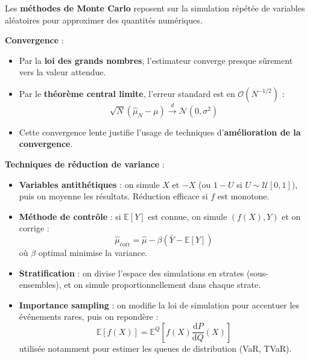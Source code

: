 \begin{f}

Les \textbf{méthodes de Monte Carlo} reposent sur la simulation répétée de variables aléatoires pour approximer des quantités numériques.

\textbf{Convergence} :
\begin{itemize}[nosep]
	\item Par la \textbf{loi des grands nombres}, l’estimateur converge presque sûrement vers la valeur attendue.
	\item Par le \textbf{théorème central limite}, l’erreur standard est en $\mathcal{O}(N^{-1/2})$ :
	\[
	\sqrt{N}(\hat{\mu}_N - \mu) \xrightarrow{d} \mathcal{N}(0, \sigma^2)
	\]
	\item Cette convergence lente justifie l’usage de techniques d’\textbf{amélioration de la convergence}.
\end{itemize}

\textbf{Techniques de réduction de variance} :
\begin{itemize}
	\item \textbf{Variables antithétiques} : on simule $X$ et $-X$ (ou $1-U$ si $U \sim \mathcal{U}[0,1]$), puis on moyenne les résultats. Réduction efficace si $f$ est monotone.
	\item \textbf{Méthode de contrôle} : si $\mathbb{E}[Y]$ est connue, on simule $(f(X), Y)$ et on corrige :
	\[
	\hat{\mu}_\text{corr} = \hat{\mu} - \beta(\bar{Y} - \mathbb{E}[Y])
	\]
	où $\beta$ optimal minimise la variance.
	\item \textbf{Stratification} : on divise l’espace des simulations en strates (sous-ensembles), et on simule proportionnellement dans chaque strate.
	\item \textbf{Importance sampling} : on modifie la loi de simulation pour accentuer les événements rares, puis on repondère :
	\[
	\mathbb{E}[f(X)] = \mathbb{E}^{Q}\left[f(X) \frac{\mathrm{d}P}{\mathrm{d}Q}(X)\right]
	\]
	utilisée notamment pour estimer les queues de distribution (VaR, TVaR).
\end{itemize}

\end{f}
